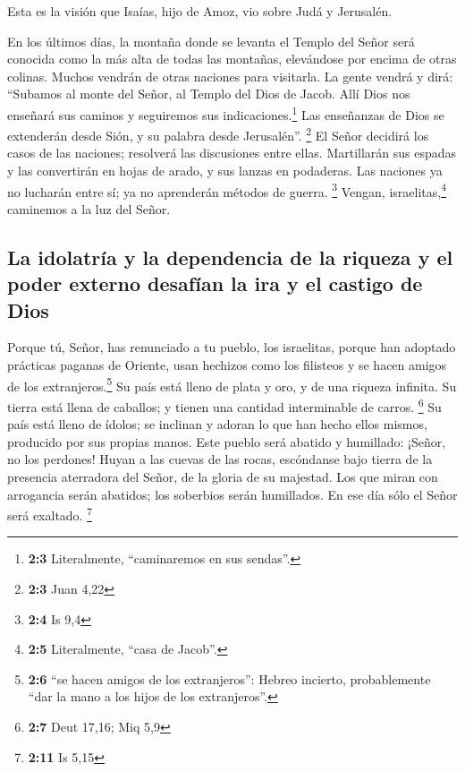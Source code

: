  Esta es la visión que Isaías, hijo de Amoz, vio sobre
Judá y Jerusalén.

 En los últimos días, la montaña donde se levanta el
Templo del Señor será conocida como la más alta de todas las montañas,
elevándose por encima de otras colinas. Muchos vendrán de otras naciones
para visitarla.  La gente vendrá y dirá: ``Subamos al
monte del Señor, al Templo del Dios de Jacob. Allí Dios nos enseñará sus
caminos y seguiremos sus indicaciones.\footnote{\textbf{2:3}
  Literalmente, ``caminaremos en sus sendas''.} Las enseñanzas de Dios
se extenderán desde Sión, y su palabra desde Jerusalén''. \footnote{\textbf{2:3}
  Juan 4,22}  El Señor decidirá los casos de las naciones;
resolverá las discusiones entre ellas. Martillarán sus espadas y las
convertirán en hojas de arado, y sus lanzas en podaderas. Las naciones
ya no lucharán entre sí; ya no aprenderán métodos de guerra. \footnote{\textbf{2:4}
  Is 9,4}  Vengan, israelitas,\footnote{\textbf{2:5}
  Literalmente, ``casa de Jacob''.} caminemos a la luz del Señor.

\hypertarget{la-idolatruxeda-y-la-dependencia-de-la-riqueza-y-el-poder-externo-desafuxedan-la-ira-y-el-castigo-de-dios}{%
\subsection{La idolatría y la dependencia de la riqueza y el poder
externo desafían la ira y el castigo de
Dios}\label{la-idolatruxeda-y-la-dependencia-de-la-riqueza-y-el-poder-externo-desafuxedan-la-ira-y-el-castigo-de-dios}}

 Porque tú, Señor, has renunciado a tu pueblo, los
israelitas, porque han adoptado prácticas paganas de Oriente, usan
hechizos como los filisteos y se hacen amigos de los
extranjeros.\footnote{\textbf{2:6} ``se hacen amigos de los
  extranjeros'': Hebreo incierto, probablemente ``dar la mano a los
  hijos de los extranjeros''.}  Su país está lleno de
plata y oro, y de una riqueza infinita. Su tierra está llena de
caballos; y tienen una cantidad interminable de carros. \footnote{\textbf{2:7}
  Deut 17,16; Miq 5,9}  Su país está lleno de ídolos; se
inclinan y adoran lo que han hecho ellos mismos, producido por sus
propias manos.  Este pueblo será abatido y humillado:
¡Señor, no los perdones!  Huyan a las cuevas de las
rocas, escóndanse bajo tierra de la presencia aterradora del Señor, de
la gloria de su majestad.  Los que miran con arrogancia
serán abatidos; los soberbios serán humillados. En ese día sólo el Señor
será exaltado. \footnote{\textbf{2:11} Is 5,15}

